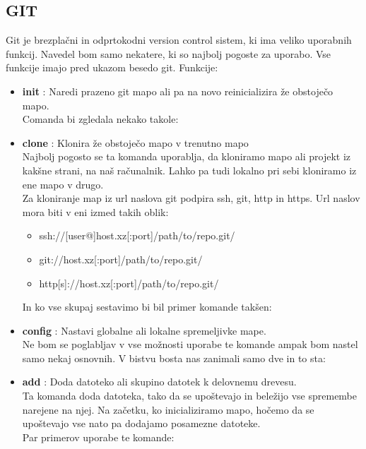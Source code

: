 {\color{indiagreen}\subsection{GIT}}
Git je brezplačni in odprtokodni version control sistem, ki ima veliko uporabnih funkcij. Navedel bom samo nekatere, ki so najbolj pogoste za uporabo.
Vse funkcije imajo pred ukazom besedo git.
Funkcije:
\begin{itemize} 
	\item \textbf{init} : Naredi prazeno git mapo ali pa na novo reinicializira že obstoječo mapo.\\
	Comanda bi zgledala nekako takole:\\
	\item \textbf{clone} : Klonira že obstoječo mapo v trenutno mapo\\
	Najbolj pogosto se ta komanda uporablja, da kloniramo mapo ali projekt iz kakšne strani, na naš računalnik. Lahko pa tudi lokalno pri sebi kloniramo iz ene mapo v drugo.\\
	Za kloniranje map iz url naslova git podpira ssh, git, http in https. Url naslov mora biti v eni izmed takih oblik:
	\begin{itemize}
		\item ssh://[user@]host.xz[:port]/path/to/repo.git/
		\item git://host.xz[:port]/path/to/repo.git/
		\item http[s]://host.xz[:port]/path/to/repo.git/ 
	\end{itemize}
	In ko vse skupaj sestavimo bi bil primer komande takšen:\\
	\item \textbf{config} : Nastavi globalne ali lokalne spremeljivke mape.\\
	Ne bom se poglabljav v vse možnosti uporabe te komande ampak bom nastel samo nekaj osnovnih. V bistvu bosta nas zanimali samo dve in to sta:\\
	\item \textbf{add} : Doda datoteko ali skupino datotek k delovnemu drevesu.\\
	Ta komanda doda datoteka, tako da se upoštevajo in beležijo vse spremembe narejene na njej. Na začetku, ko inicializiramo mapo, hočemo da se upoštevajo vse nato pa dodajamo posamezne datoteke.\\
	Par primerov uporabe te komande:\\

\end{itemize}
